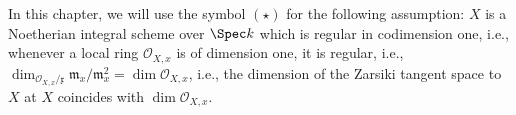 In this chapter, we will use the symbol $(\star)$ for the following assumption: $X$ is a Noetherian
integral scheme over $\Spec k$ which is regular in codimension one, i.e., whenever a local ring $\mathcal{O}_{X, x}$
is of dimension one, it is regular, i.e., $\dim_{\mathcal{O}_{X, x}/\mathfrak{x}} \mathfrak{m}_x/\mathfrak{m}_x^2 = \dim \mathcal{O}_{X, x}$,
i.e., the dimension of the Zarsiki tangent space to $X$ at $X$ coincides with $\dim \mathcal{O}_{X, x}$.
